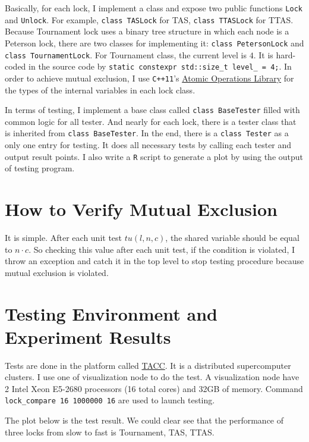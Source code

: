 \documentclass[a4paper]{report}
\begin{document}
Basically, for each lock, I implement a class and expose two public functions \lstinline{Lock} and \lstinline{Unlock}.
For example, \lstinline{class TASLock} for TAS, \lstinline{class TTASLock} for TTAS.
Because Tournament lock uses a binary tree structure in which each node is a Peterson lock, there are two classes for implementing it: \lstinline{class PetersonLock} and \lstinline{class TournamentLock}.
For Tournament class, the current level is $4$.
It is hard-coded in the source code by \lstinline{static constexpr std::size_t level_ = 4;}.
In order to achieve mutual exclusion, I use \lstinline{C++11}'s \href{http://en.cppreference.com/w/cpp/atomic}{Atomic Operations Library} for the types of the internal variables in each lock class.

In terms of testing, I implement a base class called \lstinline{class BaseTester} filled with common logic for all tester.
And nearly for each lock, there is a tester class that is inherited from \lstinline{class BaseTester}.
In the end, there is a \lstinline{class Tester} as a only one entry for testing.
It does all necessary tests by calling each tester and output result points.
I also write a \lstinline{R} script to generate a plot by using the output of testing program.

\section*{How to Verify Mutual Exclusion}
It is simple.
After each unit test $tu(l, n, c)$, the shared variable should be equal to $n \cdot c$.
So checking this value after each unit test, if the condition is violated, I throw an exception and catch it in the top level to stop testing procedure because mutual exclusion is violated.

\section*{Testing Environment and Experiment Results}
Tests are done in the platform called \href{https://www.tacc.utexas.edu/}{TACC}.
It is a distributed supercomputer clusters.
I use one of visualization node to do the test.
A visualization node have 2 Intel Xeon E5-2680 processors (16 total cores) and 32GB of memory.
Command \lstinline{lock_compare 16 1000000 16} are used to launch testing.

The plot below is the test result.
We could clear see that the performance of three locks from slow to fast is Tournament, TAS, TTAS.
\end{document}
